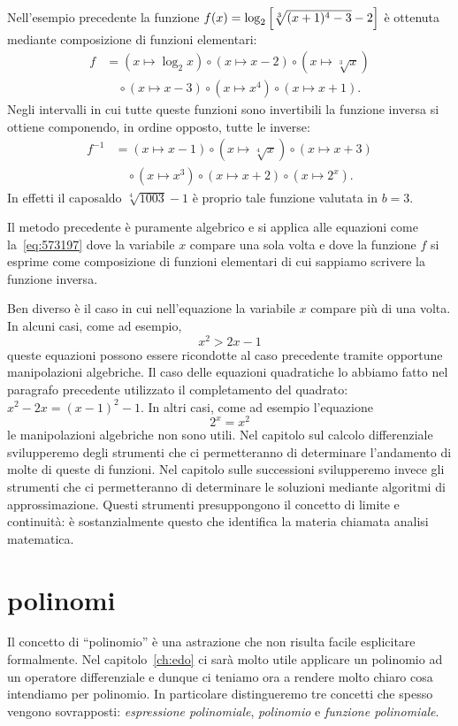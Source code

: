 Nell'esempio precedente la funzione 
$f(x) = \log_2{\left[ \sqrt[3]{(x+1)^4-3}-2 \right]}$
è ottenuta mediante composizione di funzioni elementari:
\begin{align*}
f &= (x\mapsto \log_2 x)\circ(x\mapsto x-2)\circ (x \mapsto \sqrt[3]{x})\\
  &\quad \circ (x \mapsto x-3) \circ (x\mapsto x^4) \circ (x\mapsto x+1).
\end{align*}
Negli intervalli in cui tutte queste funzioni sono invertibili 
la funzione inversa si ottiene componendo, in ordine opposto,
tutte le inverse:
\begin{align*}
  f^{-1} &= (x\mapsto x-1) \circ (x\mapsto \sqrt[4]{x}) \circ (x \mapsto x+3) \\
    &\quad \circ (x \mapsto x^3) \circ (x \mapsto x+2) \circ (x\mapsto 2^x).
\end{align*}
In effetti il caposaldo $\sqrt[4]{1003}-1$ è proprio tale 
funzione valutata in $b=3$.

Il metodo precedente è puramente algebrico e 
si applica alle equazioni 
come la~\eqref{eq:573197} dove la variabile $x$ 
compare una sola volta e dove la funzione $f$ si esprime 
come composizione di funzioni elementari di cui sappiamo 
scrivere la funzione inversa. 

Ben diverso è il caso in cui nell'equazione la variabile $x$ 
compare più di una volta.
In alcuni casi, come ad esempio,
\[
  x^2 > 2x - 1  
\]
queste equazioni 
possono essere ricondotte al caso precedente tramite 
opportune manipolazioni algebriche.
Il caso delle equazioni quadratiche lo abbiamo 
fatto nel paragrafo precedente utilizzato il completamento 
del quadrato: $x^2-2x = (x-1)^2-1$. 
In altri casi, come ad esempio l'equazione
\[
  2^x = x^2
\]  
le manipolazioni algebriche non sono utili.
Nel capitolo sul calcolo differenziale svilupperemo degli strumenti 
che ci permetteranno di determinare l'andamento di molte di queste 
di funzioni. 
Nel capitolo sulle successioni svilupperemo invece gli strumenti 
che ci permetteranno di determinare le soluzioni mediante 
algoritmi di approssimazione.
Questi strumenti presuppongono il concetto 
di limite e continuità: è sostanzialmente questo che identifica 
la materia chiamata analisi matematica.

\section{polinomi}
\label{ch:polinomi}

Il concetto di ``polinomio'' è una astrazione che non risulta facile esplicitare formalmente.
Nel capitolo~\ref{ch:edo} ci sarà molto utile applicare un polinomio ad un operatore 
differenziale e dunque ci teniamo ora a rendere molto chiaro cosa intendiamo per polinomio.
In particolare distingueremo tre concetti che spesso vengono sovrapposti: 
\emph{espressione polinomiale}, \emph{polinomio} e \emph{funzione polinomiale}.

